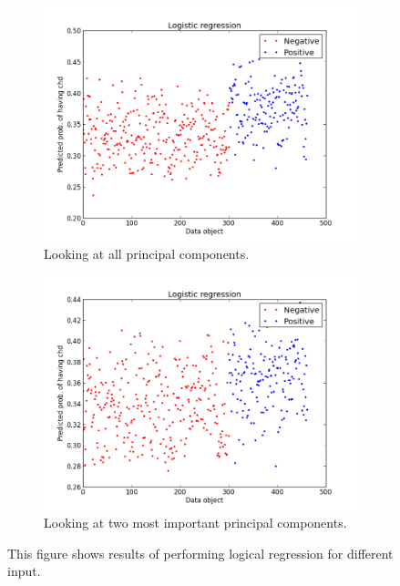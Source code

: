 \begin{figure}
	\begin{subfigure}[b]{0.5\textwidth}
	\includegraphics[scale=0.4]{pictures/logisticregressionXPC.png}
	\caption{Looking at all principal components.}
	\label{logicalRegressionResultXPA}
	\end{subfigure}
	\begin{subfigure}[b]{0.5\textwidth}
	\includegraphics[scale=0.4]{pictures/logisticregressionX2PC.png}
	\caption{Looking at two most important principal components.}
	\label{logicalRegressionResultX2PA}
	\end{subfigure}
\caption{This figure shows results of performing logical regression for different input.}
\label{logicalRegressionResults}
\end{figure}

